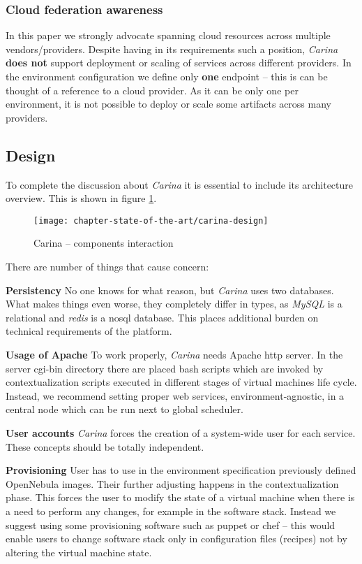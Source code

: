 \subsubsection{Cloud federation awareness}
In this paper we strongly advocate spanning cloud resources across multiple vendors/providers. Despite having in its requirements such a position, \emph{Carina} \textbf{does not} support deployment or scaling of services across different providers. In the environment configuration we define only \textbf{one} endpoint -- this is can be thought of a reference to a cloud provider. As it can be only one per environment, it is not possible to deploy or scale some artifacts across many providers.

\subsection{Design}
To complete the discussion about \emph{Carina} it is essential to include its architecture overview. This is shown in figure \ref{sota:carina-design}.

\begin{figure}[!ht]
  \begin{center}
    \texttt{[image: chapter-state-of-the-art/carina-design]}
  \end{center}
  \caption{Carina -- components interaction}
  \label{sota:carina-design}
\end{figure}

There are number of things that cause concern:
\begin{asparaenum}
\item[\textbf{Persistency}] No one knows for what reason, but \emph{Carina} uses two databases. What makes things even worse, they completely differ in types, as \emph{MySQL} is a relational and \emph{redis} is a nosql database. This places additional burden on technical requirements of the platform.
\item[\textbf{Usage of Apache}] To work properly, \emph{Carina} needs Apache http server. In the server cgi-bin directory there are placed bash scripts which are invoked by contextualization scripts executed in different stages of virtual machines life cycle. Instead, we recommend setting proper web services, environment-agnostic, in a central node which can be run next to global scheduler.
\item[\textbf{User accounts}] \emph{Carina} forces the creation of a system-wide user for each service. These concepts should be totally independent.
\item[\textbf{Provisioning}] User has to use in the environment specification previously defined OpenNebula images. Their further adjusting happens in the contextualization phase. This forces the user to modify the state of a virtual machine when there is a need to perform any changes, for example in the software stack. Instead we suggest using some provisioning software such as puppet or chef -- this would enable users to change software stack only in configuration files (recipes) not by altering the virtual machine state.
\end{asparaenum}

